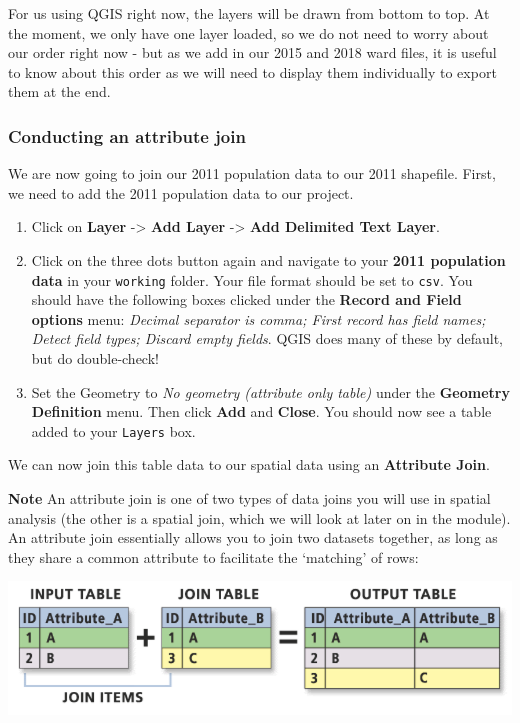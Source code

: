 \documentclass[
]{book}
\begin{document}
For us using QGIS right now, the layers will be drawn from bottom to top. At the moment, we only have one layer loaded, so we do not need to worry about our order right now - but as we add in our 2015 and 2018 ward files, it is useful to know about this order as we will need to display them individually to export them at the end.

\hypertarget{conducting-an-attribute-join}{%
\subsubsection{Conducting an attribute join}\label{conducting-an-attribute-join}}

We are now going to join our 2011 population data to our 2011 shapefile. First, we need to add the 2011 population data to our project.

\begin{enumerate}
\def\labelenumi{\arabic{enumi}.}
\setcounter{enumi}{12}
\item
  Click on \textbf{Layer} -\textgreater{} \textbf{Add Layer} -\textgreater{} \textbf{Add Delimited Text Layer}.
\item
  Click on the three dots button again and navigate to your \textbf{2011 population data} in your \texttt{working} folder. Your file format should be set to \texttt{csv}. You should have the following boxes clicked under the \textbf{Record and Field options} menu: \emph{Decimal separator is comma; First record has field names; Detect field types; Discard empty fields}. QGIS does many of these by default, but do double-check!
\item
  Set the Geometry to \emph{No geometry (attribute only table)} under the \textbf{Geometry Definition} menu. Then click \textbf{Add} and \textbf{Close}. You should now see a table added to your \texttt{Layers} box.
\end{enumerate}

We can now join this table data to our spatial data using an \textbf{Attribute Join}.

\textbf{Note}
An attribute join is one of two types of data joins you will use in spatial analysis (the other is a spatial join, which we will look at later on in the module). An attribute join essentially allows you to join two datasets together, as long as they share a common attribute to facilitate the `matching' of rows:

\begin{center}\includegraphics[width=12.08in]{images/w02/attribute_joins} \end{center}
\end{document}
